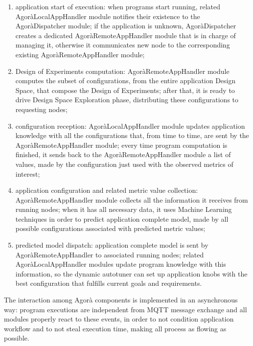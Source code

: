 \begin{enumerate}

    \item application start of execution: when programs start running, related AgoràLocalAppHandler module notifies their existence to the AgoràDispatcher module; if the application is unknown, AgoràDispatcher creates a dedicated AgoràRemoteAppHandler module that is in charge of managing it, otherwise it communicates new node to the corresponding existing AgoràRemoteAppHandler module;
    
    \item Design of Experiments computation: AgoràRemoteAppHandler module computes the subset of configurations, from the entire application Design Space, that compose the Design of Experiments; after that, it is ready to drive Design Space Exploration phase, distributing these configurations to requesting nodes;
    
    \item configuration reception: AgoràLocalAppHandler module updates application knowledge with all the configurations that, from time to time, are sent by the AgoràRemoteAppHandler module; every time program computation is finished, it sends back to the AgoràRemoteAppHandler module a list of values, made by the configuration just used with the observed metrics of interest;
    
    \item application configuration and related metric value collection: A\-go\-rà\-Remote\-App\-Handler module collects all the information it receives from running nodes; when it has all necessary data, it uses Machine Learning techniques in order to predict application complete model, made by all possible configurations associated with predicted metric values;
    
    \item predicted model dispatch: application complete model is sent by AgoràRemoteAppHandler to associated running nodes; related AgoràLocalAppHandler modules update program knowledge with this information, so the dynamic autotuner can set up application knobs with the best configuration that fulfills current goals and requirements.

\end{enumerate}

The interaction among Agorà components is implemented in an asynchronous way: program executions are independent from MQTT message exchange and all modules properly react to these events, in order to not condition application workflow and to not steal execution time, making all process as flowing as possible.

